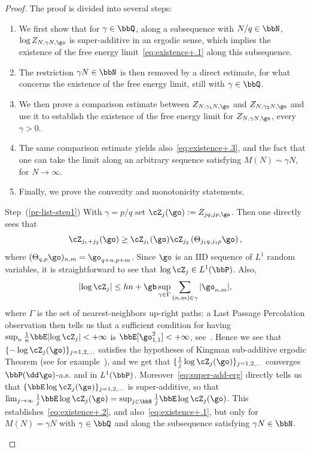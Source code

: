 \begin{proof}
The proof is divided into several steps:
\begin{enumerate}
\item\label{pr-list-step1} We first show that for $\gamma \in \bbQ$, along a subsequence with $ N/q\in \bbN$, $\log Z_{N, \gamma N, \go}$ is super-additive in an ergodic sense, which implies the existence of the free energy limit~\eqref{eq:existence+.1} along this subsequence.
\item \label{pr-list-step2} The restriction $\gamma N\in \bbN$ is then removed by a direct estimate, for what concerns the existence of the free energy limit, still with $\gamma \in \bbQ$.
\item \label{pr-list-step3}We then prove a comparison estimate between $Z_{N, \gamma_1 N, \go}$ and $Z_{N, \gamma_2 N, \go}$ and use it to establish the existence of the free energy limit for $Z_{N, \gamma N, \go} $, every $\gamma>0$.
\item \label{pr-list-step4}The same comparison estimate yields also~\eqref{eq:existence+.3}, and the fact that one can take the limit along an arbitrary sequence satisfying $M (N) \sim \gamma N$, for $N \to \infty$.
\item \label{pr-list-step5}Finally, we prove the convexity and monotonicity statements.
\end{enumerate}
\goodbreak

\begin{step}{Step~(\ref{pr-list-step1})}
With $\gamma=p/q$ set $
\cZ_{j}(\go) := Z_{jq, jp, \go}$. Then one directly sees that
\begin{equation}\label{eq:super-add-erg}
\cZ_{j_1+j_2}(\go)\ge \cZ_{j_1}(\go) \cZ_{j_2}\left(\Theta_{j_1 q,j_1 p} \go\right),
\end{equation}
where $(\Theta_{q,p} \go)_{n,m}= \go_{q+n,p+m}$. Since $\go$ is an IID sequence of $L^1$ random variables, it is straightforward to see that $\log \cZ_{j} \in L^1(\bbP)$. Also,
\[
\lvert \log \cZ_{j} \vert \leq h n+ \gb \sup_{\gamma \in \Gamma } \sum_{(n,m)\in\gamma} |\go_{n,m}|,
\]
where $\Gamma$ is the set of nearest-neighbors up-right paths: a Last Passage Percolation observation then tells us that a sufficient condition for having $\sup_n \frac{1}{n} \bbE \lvert\log \cZ_{j} \vert <+\infty$ is $\bbE[\go_{1,1}^2]<+\infty$, see~\cite{cf:Martin02}. Hence we see that $\{ -\log \cZ_{j}(\go)\}_{j=1,2, \ldots}$ satisfies the hypotheses of Kingman sub-additive ergodic Theorem (see for example~\cite[Section~A.7]{cf:GB}), and we get that $\{\frac{1}{j}\log \cZ_{j}(\go)\}_{j=1,2,\ldots}$ converges $\bbP(\dd \go)$-a.s. and in $L^1(\bbP)$. Moreover~\eqref{eq:super-add-erg} directly tells us that $\{\bbE \log \cZ_{j}(\go)\}_{j=1,2, \ldots}$ is super-additive, so that $\lim _{j\to \infty} \frac{1}{j} \bbE \log \cZ_{j}(\go)= \sup_{j\in \bbN} \frac{1}{j} \bbE \log \cZ_{j}(\go)$. This establishes~\eqref{eq:existence+.2}, and also~\eqref{eq:existence+.1}, but only for $M(N)= \gamma N$ with $\gamma \in \bbQ$ and along the subsequence satisfying $\gamma N \in \bbN$.
\end{step}


\end{proof}
